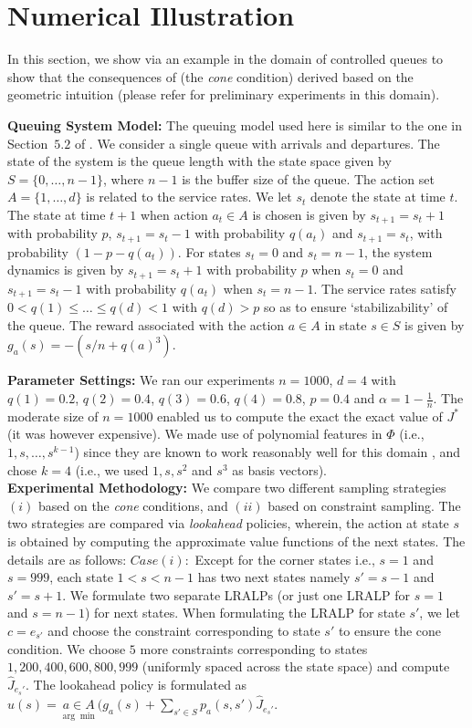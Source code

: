 \section{Numerical Illustration}
In this section, we show via an example in the domain of controlled queues to show that the consequences of  (the \emph{cone} condition) derived based on the geometric intuition (please refer \cite{aaaipaper} for preliminary experiments in this domain).

\textbf{Queuing System Model:} The queuing model used here is similar to the one in Section~$5.2$ of \cite{ALP}. We consider a single queue with arrivals and departures. The state of the system is the queue length with the state space given by $S=\{0,\ldots,n-1\}$, where $n-1$ is the buffer size of the queue. The action set $A=\{1,\ldots,d\}$ is related to the service rates. We let $s_t$ denote the state at time $t$. The state at time $t+1$ when action $a_t \in A $ is chosen is given by $s_{t+1}= s_{t}+1$ with probability $p$, $s_{t+1}= s_{t}-1$ with probability $q(a_t)$ and $s_{t+1}= s_t$, with probability $(1-p-q(a_t))$. For states $s_t=0$ and $s_t=n-1$, the system dynamics is given by $s_{t+1}= s_{t}+1$ with probability $p$ when $s_t=0$ and $s_{t+1}=s_t-1$ with probability $q(a_t)$ when $s_t=n-1$. The service rates satisfy $0<q(1)\leq \ldots\leq q(d)<1$ with $q(d)>p$ so as to ensure `stabilizability' of the queue. The reward associated with the action $a \in A$ in state $s\in S$ is given by $g_a(s)=-(s/n+q(a)^3)$.\par
\textbf{Parameter Settings:} We ran our experiments $n=1000$, $d=4$ with $q(1)=0.2$, $q(2)=0.4$, $q(3)=0.6$, $q(4)=0.8$, $p=0.4$ and $\alpha=1-\frac{1}{n}$.
The moderate size of $n=1000$ enabled us to compute the exact the exact value of $J^*$ (it was however expensive). We made use of polynomial features in $\Phi$ (i.e., $1,s,\ldots,s^{k-1}$) since they are known to work reasonably well for this domain \cite{ALP}, and chose $k=4$ (i.e., we used $1, s,s^2$ and $s^3$ as basis vectors).\\
\textbf{Experimental Methodology:} We compare two different sampling strategies $(i)$ based on the \emph{cone} conditions, and $(ii)$ based on constraint sampling. The two strategies are compared via  \emph{lookahead} policies, wherein, the action at state $s$ is obtained by computing the approximate value functions of the next states. The details are as follows:
$Case (i):$ Except for the corner states i.e., $s=1$ and $s=999$, each state $1<s<n-1$ has two next states namely $s'=s-1$ and $s'=s+1$. We formulate two separate LRALPs (or just one LRALP for $s=1$ and $s=n-1$) for next states. When formulating the LRALP for state $s'$, we let $c=e_{s'}$ and choose the constraint corresponding to state $s'$ to ensure the cone condition. We choose $5$ more constraints corresponding to states $1,200,400,600,800,999$ (uniformly spaced across the state space) and compute $\hat{J}_{e_s'}$. The lookahead policy is formulated as $u(s)=\underset{\arg\min}{a\in A}(g_a(s)+\underset{s'\in S}{\sum}p_a(s,s')\hat{J}_{e_s'}$.\\
